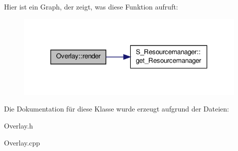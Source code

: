 Hier ist ein Graph, der zeigt, was diese Funktion aufruft\-:
\nopagebreak
\begin{figure}[H]
\begin{center}
\leavevmode
\includegraphics[width=316pt]{class_overlay_ab5e47eefa2743c08bc208131c8b17a45_cgraph}
\end{center}
\end{figure}




Die Dokumentation für diese Klasse wurde erzeugt aufgrund der Dateien\-:\begin{DoxyCompactItemize}
\item 
Overlay.\-h\item 
Overlay.\-cpp\end{DoxyCompactItemize}
